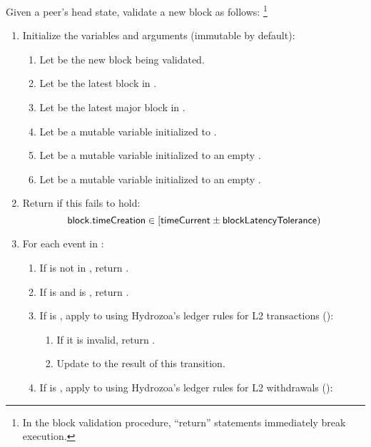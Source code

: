 \documentclass[../hydrozoa.tex]{subfiles}
\begin{document}
Given a peer's head state, validate a new block as follows:%
\footnote{In the block validation procedure, ``return'' statements immediately break execution.}
\begin{enumerate}
  \item Initialize the variables and arguments (immutable by default):
    \begin{enumerate}
      \item Let  be the new block being validated.
      \item Let  be the latest block in .
      \item Let  be the latest major block in .
      \item Let  be a mutable variable initialized to .
      \item Let  be a mutable variable initialized to an empty .
      \item Let  be a mutable variable initialized to an empty .
    \end{enumerate}
  \item Return  if this fails to hold:
    \begin{equation*}
      \mathsf{block.timeCreation} \in [\mathsf{timeCurrent} \pm \mathsf{blockLatencyTolerance})
    \end{equation*}
  \item For each event  in :
    \begin{enumerate}
      \item If  is not in , return .
      \item If  is  and  is , return .
      \item If  is , apply  to  using Hydrozoa's ledger rules for L2 transactions ():
        \begin{enumerate}
          \item If it is invalid, return .
          \item Update  to the result of this transition.
        \end{enumerate}
      \item If  is , apply  to  using Hydrozoa's ledger rules for L2 withdrawals ():

\end{enumerate}
\end{enumerate}
\end{document}
